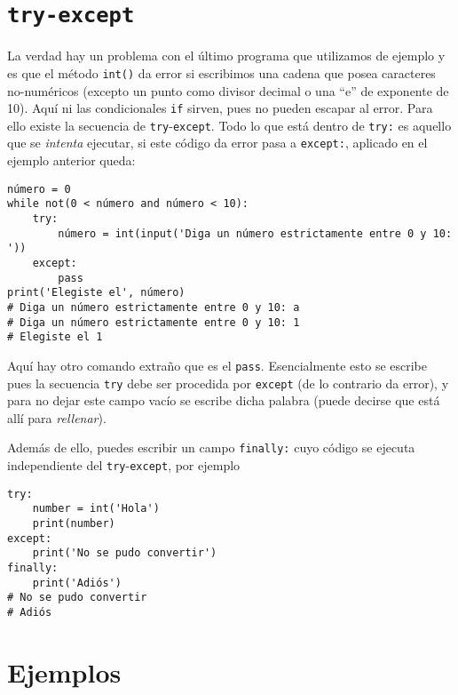 \documentclass[11pt,twoside]{report}
\begin{document}
\section{\texttt{try-except}}
La verdad hay un problema con el último programa que utilizamos de ejemplo y es que el método \lstinline|int()| da error si escribimos una cadena que posea caracteres no-numéricos (excepto un punto como divisor decimal o una ``e'' de exponente de 10). Aquí ni las condicionales \lstinline|if| sirven, pues no pueden escapar al error. Para ello existe la secuencia de \lstinline|try|-\lstinline|except|. Todo lo que está dentro de \lstinline|try:| es aquello que se \textit{intenta} ejecutar, si este código da error pasa a \lstinline|except:|, aplicado en el ejemplo anterior queda:
\begin{lstlisting}
número = 0
while not(0 < número and número < 10):
    try:
        número = int(input('Diga un número estrictamente entre 0 y 10: '))
    except:
        pass
print('Elegiste el', número)
# Diga un número estrictamente entre 0 y 10: a
# Diga un número estrictamente entre 0 y 10: 1
# Elegiste el 1
\end{lstlisting}
Aquí hay otro comando extraño que es el \lstinline|pass|. Esencialmente esto se escribe pues la secuencia \lstinline|try| debe ser procedida por \lstinline|except| (de lo contrario da error), y para no dejar este campo vacío se escribe dicha palabra (puede decirse que está allí para \textit{rellenar}).

Además de ello, puedes escribir un campo \lstinline|finally:| cuyo código se ejecuta independiente del \lstinline|try|-\lstinline|except|, por ejemplo
\begin{lstlisting}
try:
	number = int('Hola')
	print(number)
except:
	print('No se pudo convertir')
finally:
	print('Adiós')
# No se pudo convertir
# Adiós
\end{lstlisting}

\section{Ejemplos}
\end{document}
